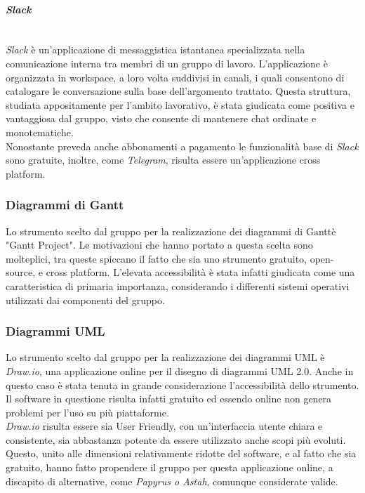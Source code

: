 \paragraph{\textit{Slack}} ~\\
	\textit{Slack} è un'applicazione di messaggistica istantanea specializzata nella comunicazione interna tra membri di un gruppo di lavoro. L'applicazione è organizzata in workspace, a loro volta suddivisi in canali, i quali 			consentono di catalogare le conversazione sulla base dell'argomento trattato. Questa struttura, studiata 						appositamente per l'ambito lavorativo, è stata giudicata come positiva e vantaggiosa dal gruppo, visto che 					consente di mantenere chat ordinate e monotematiche.\\
	Nonostante preveda anche abbonamenti a pagamento le funzionalità base di \textit{Slack} sono gratuite, inoltre, come \textit{Telegram}, risulta essere un'applicazione cross platform\glossario.

\subsubsection{Diagrammi di Gantt}
	Lo strumento scelto dal gruppo per la realizzazione dei diagrammi di Gantt\glossario è "Gantt Project". Le 					motivazioni che hanno portato a questa scelta sono molteplici, tra queste spiccano il fatto che sia uno strumento 	gratuito, open-source\glossario, e cross platform. L'elevata accessibilità è stata infatti 				giudicata come una caratteristica di primaria importanza, considerando i differenti sistemi operativi utilizzati 		dai componenti del gruppo.

\subsubsection{Diagrammi UML}
	Lo strumento scelto dal gruppo per la realizzazione dei diagrammi UML è \textit{Draw.io}, una applicazione online per il disegno di diagrammi UML 2.0. Anche in questo caso è stata tenuta in grande considerazione l'accessibilità dello strumento. Il software in questione risulta infatti gratuito ed essendo online non genera problemi per l'uso su più piattaforme.\\
	\textit{Draw.io} risulta essere sia User Friendly, con un'interfaccia utente chiara e consistente, sia abbastanza potente da essere utilizzato anche scopi più evoluti. Questo, unito alle dimensioni relativamente ridotte del software, e al fatto che sia gratuito, hanno fatto propendere il gruppo per questa applicazione online, a discapito di alternative, come \textit{Papyrus o Astah}, comunque considerate valide.
